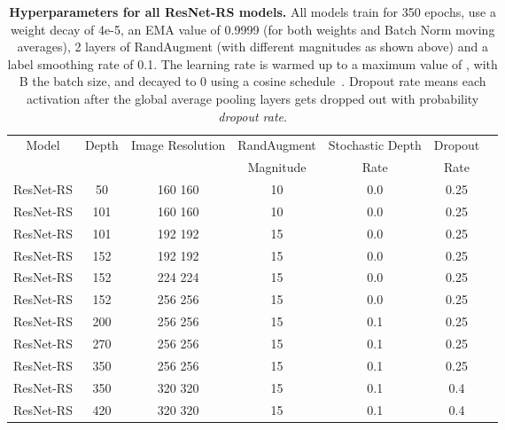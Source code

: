 \documentclass{article}
\begin{document}
\begin{table}[h!]
    \small
    \begin{center}
\begin{tabular}{ccccccc}
      \toprule
      Model & Depth & Image Resolution & RandAugment & Stochastic Depth & Dropout   \\
      & & & Magnitude & Rate & Rate \\
      \midrule
      ResNet-RS & 50 & 160  160 & 10 & 0.0 & 0.25\\
      \midrule
      
      ResNet-RS & 101 & 160  160 & 10 & 0.0 & 0.25\\
      \midrule
      
      ResNet-RS & 101 & 192  192 & 15 & 0.0 & 0.25\\ 
      ResNet-RS & 152 & 192  192 & 15 & 0.0 & 0.25\\ 
      ResNet-RS & 152 & 224  224 & 15 & 0.0 & 0.25\\ 
      \midrule
      
      ResNet-RS & 152 & 256  256 & 15 & 0.0 & 0.25\\ 
      \midrule
      
      ResNet-RS & 200 & 256  256 & 15 & 0.1 & 0.25\\ 
      ResNet-RS & 270 & 256  256 & 15 & 0.1 & 0.25\\ 
      \midrule
      
      ResNet-RS & 350 & 256  256 & 15 & 0.1 & 0.25\\
      \midrule
      
      ResNet-RS & 350 & 320  320 & 15 & 0.1 & 0.4\\
      ResNet-RS & 420 & 320  320 & 15 & 0.1 & 0.4\\
      \bottomrule
    \end{tabular}
    \end{center}
    \caption{\textbf{Hyperparameters for all ResNet-RS models.} 
    All models train for 350 epochs, use a weight decay of 4e-5, an EMA value of 0.9999 (for both weights and Batch Norm moving averages), 2 layers of RandAugment (with different magnitudes as shown above) and a label smoothing rate of 0.1. 
    The learning rate is warmed up to a maximum value of , with B the batch size, and decayed to 0 using a cosine schedule~\cite{loshchilov2016sgdr}.
    Dropout rate means each activation after the global average pooling layers gets dropped out with probability \emph{dropout rate}.
    }
\label{tab:pareto_curve_hparams} 
\end{table}
\end{document}

